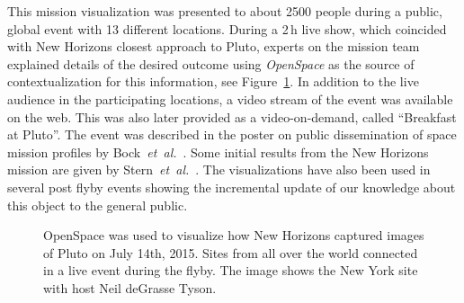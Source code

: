 \documentclass[journal]{vgtc}                %
\newcommand{\alexcomment}[1]{\textbf{[-Alex-~}
    \textcolor{magenta}{#1}
    \textbf{~]}}
\newcommand{\fig}[1]{Figure~\ref{fig:#1}}
\newcommand{\etal}{\emph{et~al.}}
\begin{document}
This mission visualization was presented to about 2500 people during a public, global event with 13 different locations.
During a 2\,h live show, which coincided with New Horizons closest approach to Pluto, experts on the mission team explained details of the desired outcome using \emph{OpenSpace} as the source of contextualization for this information, see \fig{nh_event}.
In addition to the live audience in the participating locations, a video stream of the event was available on the web. This was also later provided as a video-on-demand, called ``Breakfast at Pluto''.
The event was described in the poster on public dissemination of space mission profiles by Bock~\etal~\cite{Bock_2015}.
Some initial results from the New Horizons mission are given by Stern~\etal~\cite{stern2015pluto}.
The visualizations have also been used in several post flyby events showing the incremental update of our knowledge about this object to the general public.

\begin{figure}
    \centering
        \caption{OpenSpace was used to visualize how New Horizons captured images of Pluto on July 14th, 2015. Sites from all over the world connected in a live event during the flyby. The image shows the New York site with host Neil deGrasse Tyson.}\vspace*{-3mm}
    \label{fig:nh_event}
\end{figure}

\end{document}
